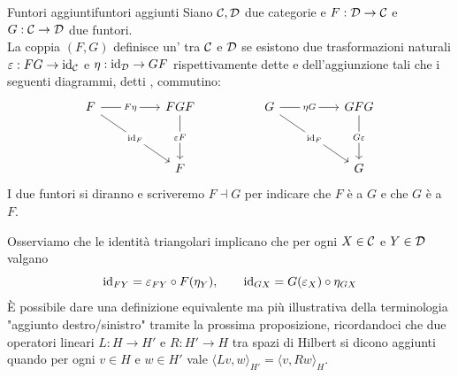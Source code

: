 \documentclass[openany]{book}
\renewcommand\C{\mc{C}}
\newcommand\D{\mc{D}}
\begin{document}
\begin{definition}{Funtori aggiunti}{funtori aggiunti}
    Siano $\C,\D$ due categorie e $F:\D\to\C$ e $G:\C\to\D$ due funtori.\\
    La coppia $(F,G)$ definisce un' tra $\C$ e $\D$ se esistono due trasformazioni naturali $\varepsilon : FG\to \id_\C$ e $\eta:\id_\D \to GF$ rispettivamente dette  e  dell'aggiunzione tali che i seguenti diagrammi, detti , commutino: 
    \[\begin{tikzcd}
	    F && FGF && G && GFG \\
	    \\
	    && F &&&& G
	    \arrow["{F\eta}"{description}, from=1-1, to=1-3]
	    \arrow["{\id_F}"{description}, from=1-1, to=3-3]
	    \arrow["{\varepsilon F}"{description}, from=1-3, to=3-3]
	    \arrow["{\eta G}"{description}, from=1-5, to=1-7]
	    \arrow["{\id_F}"{description}, from=1-5, to=3-7]
	    \arrow["{G\varepsilon}"{description}, from=1-7, to=3-7]
    \end{tikzcd}\]
    I due funtori si diranno  e scriveremo $F\dashv G$ per indicare che $F$ è  a $G$ e che $G$ è  a $F$.\\
\end{definition}

Osserviamo che le identità triangolari implicano che per ogni $X \in \C$ e $Y\in \D$ valgano 
\[ \operatorname{id}_{FY} = \varepsilon_{FY}\circ F(\eta_Y), \qquad \operatorname{id}_{GX} = G(\varepsilon_X) \circ \eta_{GX} \]
È possibile dare una definizione equivalente ma più illustrativa della terminologia "aggiunto destro/sinistro" tramite la prossima proposizione, ricordandoci che due operatori lineari $L: H\to H'$ e $R:H'\to H$ tra spazi di Hilbert si dicono aggiunti quando per ogni $v \in H$ e $w \in H'$ vale $\langle Lv, w \rangle_{H'} = \langle v, Rw\rangle_H$.
\end{document}
